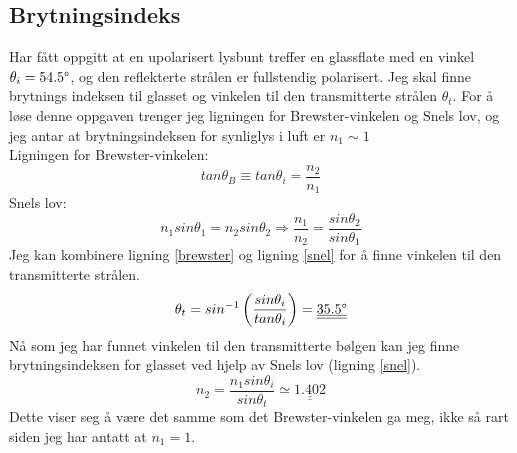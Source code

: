 \documentclass[a4paper,12pt,norsk]{article}
\newcommand{\uu}{\underline}
\begin{document}
\subsection{Brytningsindeks}
Har fått oppgitt at en upolarisert lysbunt treffer en glassflate med en vinkel $\theta_i = 54.5\degree$, og den reflekterte strålen er fullstendig polarisert. Jeg skal finne brytnings indeksen til glasset og vinkelen til den transmitterte strålen $\theta_t$.
For å løse denne oppgaven trenger jeg ligningen for Brewster-vinkelen og Snels lov, og jeg antar at brytningsindeksen for synliglys i luft er $n_1 \sim 1$\\
Ligningen for Brewster-vinkelen:
\begin{equation}
tan\theta_B \equiv tan\theta_i = \frac{n_2}{n_1}
\label{brewster}
\end{equation}
Snels lov: 
\begin{equation}
n_1sin\theta_1 = n_2sin\theta_2 \Rightarrow \frac{n_1}{n_2} = \frac{sin\theta_2}{sin\theta_1}
\label{snel}
\end{equation}
Jeg kan kombinere ligning \ref{brewster} og ligning \vref{snel} for å finne vinkelen til den transmitterte strålen.
$$
\theta_t = sin^{-1}\left(\frac{sin\theta_i}{tan\theta_i}\right) = \uu{\uu{35.5\degree }}
$$
Nå som jeg har funnet vinkelen til den transmitterte bølgen kan jeg finne brytningsindeksen for glasset ved hjelp av Snels lov (ligning \ref{snel}). 
$$
n_2 = \frac{n_1sin\theta_i}{sin\theta_t} \simeq \uu{\uu{1.402}}
$$
Dette viser seg å være det samme som det Brewster-vinkelen ga meg, ikke så rart siden jeg har antatt at $n_1 = 1$. 
\end{document}
